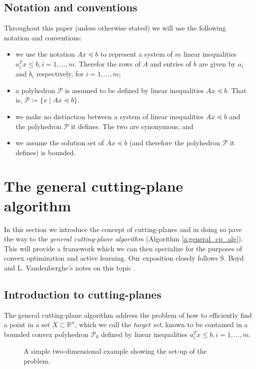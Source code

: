 \documentclass[11pt]{amsart}
\theoremstyle{definition}
\theoremstyle{remark}
\newcommand{\transpose}{T}
\begin{document}
    \subsection{Notation and conventions}
        Throughout this paper (unless otherwise stated) we will use the following notation and conventions: 
        \begin{itemize}
            \item we use the notation $Ax \preceq b$ to represent a system of $m$ linear inequalities $a_i^\transpose x \leq b, i = 1, \dots, m$. Therefor the rows of $A$ and entries of $b$ are given by $a_i$ and $b_i$ respectively, for $i = 1, \dots, m$;
            \item a polyhedron $\mathcal{P}$ is assumed to be defined by linear inequalities $Ax \preceq b$. That is, $\mathcal{P} \coloneqq \{x \;|\; Ax \preceq b\}$.
            \item we make no distinction between a system of linear inequalities $Ax \preceq b$ and the polyhedron $\mathcal{P}$ it defines. The two are synonymous; and 
            \item we assume the solution set of $Ax \preceq b$ (and therefore the polyhedron $\mathcal{P}$ it defines) is bounded. 
        \end{itemize}  


\section{The general cutting-plane algorithm}
    In this section we introduce the concept of cutting-planes and in doing so pave the way to the \emph{general cutting-plane algorithm} (Algorithm \ref{a:general_cp_alg}). This will provide a framework which we can then specialize for the purposes of convex optimization and active learning. Our exposition closely follows S. Boyd and L. Vandenberghe's notes on this topic \cite[Sections 1-3]{BV11}. 

    \subsection{Introduction to cutting-planes}
        The general cutting-plane algorithm address the problem of how to efficiently find a point in a set $X \subset \mathbb{R}^n$, which we call the \emph{target set}, known to be contained in a bounded convex polyhedron $\mathcal{P}_0$ defined by linear inequalities $a_i^\transpose x \leq b, i = 1, \dots, m$. 

        \begin{figure}
            \caption{A simple two-dimensional example showing the set-up of the problem.}
        \end{figure}
\end{document}
